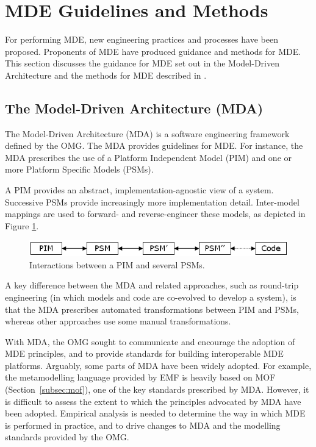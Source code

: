 
\section{MDE Guidelines and Methods}
\label{sec:mde_methods}
For performing MDE, new engineering practices and processes have been proposed. Proponents of MDE have produced guidance and methods for MDE. This section discusses the guidance for MDE set out in the Model-Driven Architecture \cite{mda} and the methods for MDE described in \cite{stahl06mdsd,kelly08dsm,greenfield04software}. 

\subsection{The Model-Driven Architecture (MDA)}
The Model-Driven Architecture (MDA) is a software engineering framework defined by the OMG. The MDA provides guidelines for MDE. For instance, the MDA prescribes the use of a Platform Independent Model (PIM) and one or more Platform Specific Models (PSMs).

A PIM provides an abstract, implementation-agnostic view of a system. Successive PSMs provide increasingly more implementation detail. Inter-model mappings are used to forward- and reverse-engineer these models, as depicted in
Figure \ref{fig:mda}.

\begin{figure}[htbp]
  \begin{center}
    \leavevmode
    \includegraphics[scale=0.5]{2.Background/images/PIMs_and_PSMs.png}
  \end{center}
  \caption{Interactions between a PIM and several PSMs.}
  \label{fig:mda}
\end{figure}

A key difference between the MDA and related approaches, such as round-trip engineering (in which models and code are co-evolved to develop a system), is that the MDA prescribes automated transformations between PIM and PSMs, whereas other approaches use some manual transformations.

With MDA, the OMG sought to communicate and encourage the adoption of MDE principles, and to provide standards for building interoperable MDE platforms. Arguably, some parts of MDA have been widely adopted. For example, the metamodelling language provided by EMF is heavily based on MOF (Section~\ref{subsec:mof}), one of the key standards prescribed by MDA. However, it is difficult to assess the extent to which the principles advocated by MDA have been adopted. Empirical analysis is needed to determine the way in which MDE is performed in practice, and to drive changes to MDA and the modelling standards provided by the OMG.

